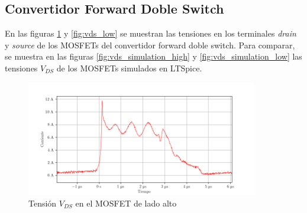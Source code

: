 








\subsection{Convertidor Forward Doble Switch}




En las figuras \ref{fig:vds_high} y \ref{fig:vds_low} se muestran las tensiones en los terminales \textit{drain} y \textit{source} de los MOSFETs del convertidor forward doble switch.
Para comparar, se muestra en las figuras \ref{fig:vds_simulation_high} y \ref{fig:vds_simulation_low} las tensiones $V_{DS}$ de los MOSFETs simulados en LTSpice. 

\begin{figure}[H]
    \centering
    \includegraphics[width=0.9\textwidth]{images/capturas-osciloscopio/17-11-2022/33.png}
    \caption{Tensión $V_{DS}$ en el MOSFET de lado alto}
    \label{fig:vds_high}
\end{figure}

